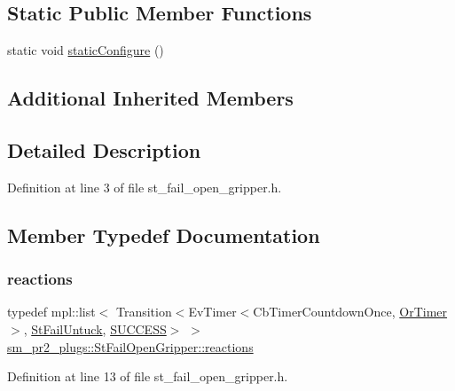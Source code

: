 \subsection*{Static Public Member Functions}
\begin{DoxyCompactItemize}
\item 
static void \hyperlink{structsm__pr2__plugs_1_1StFailOpenGripper_aec94e3e8bea31f8eb3f37c11e57fd5d1}{static\+Configure} ()
\end{DoxyCompactItemize}
\subsection*{Additional Inherited Members}


\subsection{Detailed Description}


Definition at line 3 of file st\+\_\+fail\+\_\+open\+\_\+gripper.\+h.



\subsection{Member Typedef Documentation}
\mbox{\label{structsm__pr2__plugs_1_1StFailOpenGripper_a64622a0c63bb5c86b60552ba92437e91}} 
\subsubsection{\texorpdfstring{reactions}{reactions}}
{\footnotesize\ttfamily typedef mpl\+::list$<$ Transition$<$Ev\+Timer$<$Cb\+Timer\+Countdown\+Once, \hyperlink{classsm__pr2__plugs_1_1OrTimer}{Or\+Timer}$>$, \hyperlink{structsm__pr2__plugs_1_1StFailUntuck}{St\+Fail\+Untuck}, \hyperlink{classSUCCESS}{S\+U\+C\+C\+E\+SS}$>$ $>$ \hyperlink{structsm__pr2__plugs_1_1StFailOpenGripper_a64622a0c63bb5c86b60552ba92437e91}{sm\+\_\+pr2\+\_\+plugs\+::\+St\+Fail\+Open\+Gripper\+::reactions}}



Definition at line 13 of file st\+\_\+fail\+\_\+open\+\_\+gripper.\+h.



